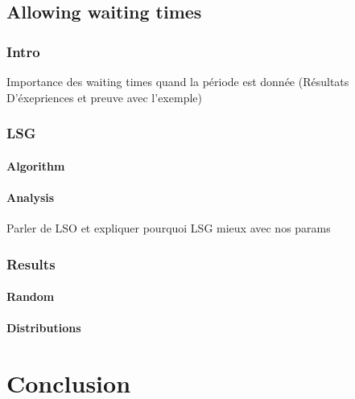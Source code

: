 \documentclass[a4paper,10pt]{article}
\begin{document}
   \subsection{Allowing waiting times}
     \subsubsection{Intro}
	Importance des waiting times quand la période est donnée (Résultats D'éxepriences et preuve avec l'exemple)
     \subsubsection{LSG}
	\paragraph{Algorithm}
	\paragraph{Analysis}
	  Parler de LSO et expliquer pourquoi LSG mieux avec nos params
     \subsubsection{Results}
	 \paragraph{Random}
	 \paragraph{Distributions}
   
\section{Conclusion}
\end{document}
